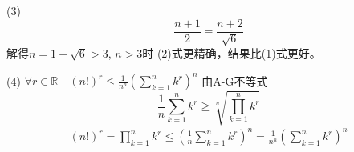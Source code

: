 \documentclass[10pt,a4paper]{book}
\begin{document}
	(3) 
	\begin{equation*}
		\frac{n+1}{2} = \frac{n+2}{\sqrt{6}}
	\end{equation*}
	解得$ n=1+\sqrt{6} >3 $, 
	$ n>3 $时 (2)式更精确，结果比(1)式更好。
	
	(4) $ \forall r \in \mathbb{R} \quad (n!)^r \le \frac{1}{n^n}(\sum_{k=1}^n k^r)^n$
	由A-G不等式
	\begin{equation*}
		\frac{1}{n}\sum_{k=1}^n k^r \ge \sqrt[n]{\prod_{k=1}^n k^r}
	\end{equation*}
	\begin{equation*}
		\begin{aligned}
			(n!)^r  = \prod_{k=1}^n k^r\le (\frac{1}{n}\sum_{k=1}^n k^r)^n =\frac{1}{n^n}(\sum_{k=1}^n k^r)^n
		\end{aligned}
	\end{equation*}
	
	
	
\end{document}
